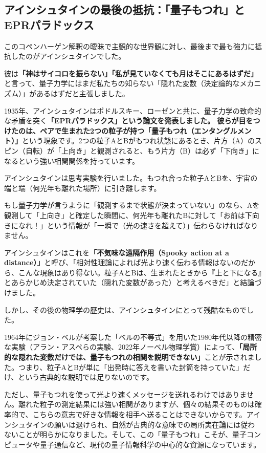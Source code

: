 \subsection{アインシュタインの最後の抵抗：「量子もつれ」とEPRパラドックス}

このコペンハーゲン解釈の曖昧で主観的な世界観に対し、最後まで最も強力に抵抗したのがアインシュタインでした。

彼は\textbf{「神はサイコロを振らない」「私が見ていなくても月はそこにあるはずだ」}と言って、量子力学にはまだ私たちの知らない「隠れた変数（決定論的なメカニズム）」があるはずだと主張しました。

1935年、アインシュタインはポドルスキー、ローゼンと共に、量子力学の致命的な矛盾を突く\textbf{「EPRパラドックス」という論文を発表しました。 彼らが目をつけたのは、ペアで生まれた2つの粒子が持つ「量子もつれ（エンタングルメント）」}という現象です。2つの粒子AとBがもつれ状態にあるとき、片方（A）のスピン（自転）が「上向き」と観測されると、もう片方（B）は必ず「下向き」になるという強い相関関係を持っています。

アインシュタインは思考実験を行いました。もつれ合った粒子AとBを、宇宙の端と端（何光年も離れた場所）に引き離します。

もし量子力学が言うように「観測するまで状態が決まっていない」のなら、Aを観測して「上向き」と確定した瞬間に、何光年も離れたBに対して「お前は下向きになれ！」という情報が「一瞬で（光の速さを超えて）」伝わらなければなりません。

アインシュタインはこれを\textbf{「不気味な遠隔作用（Spooky action at a distance）」}と呼び、「相対性理論によれば光より速く伝わる情報はないのだから、こんな現象はあり得ない。粒子AとBは、生まれたときから『上と下になる』とあらかじめ決定されていた（隠れた変数があった）と考えるべきだ」と結論づけました。

しかし、その後の物理学の歴史は、アインシュタインにとって残酷なものでした。

1964年にジョン・ベルが考案した「ベルの不等式」を用いた1980年代以降の精密な実験（アラン・アスペらの実験、2022年ノーベル物理学賞）によって、\textbf{「局所的な隠れた変数だけでは、量子もつれの相関を説明できない」}ことが示されました。つまり、粒子AとBが単に「出発時に答えを書いた封筒を持っていた」だけ、という古典的な説明では足りないのです。

ただし、量子もつれを使って光より速くメッセージを送れるわけではありません。離れた粒子の測定結果には強い相関がありますが、個々の結果そのものは確率的で、こちらの意志で好きな情報を相手へ送ることはできないからです。アインシュタインの願いは退けられ、自然が古典的な意味での局所実在論には従わないことが明らかになりました。そして、この「量子もつれ」こそが、量子コンピュータや量子通信など、現代の量子情報科学の中心的な資源になっています。

